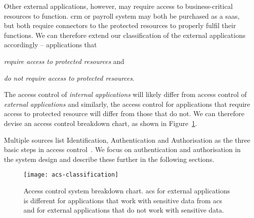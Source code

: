 Other external applications, however, may require access to business-critical resources to function. \acrlong{crm} or payroll system may both be purchased as a \acrshort{saas}, but both require connectors to the protected resources to properly fulfil their functions. We can therefore extend our classification of the external applications accordingly -- applications that
\begin{enumerate*}[label=(\roman*)]
    \item \textit{require access to protected resources} and
    \item \textit{do not require access to protected resources}.
\end{enumerate*}

The access control of \textit{internal applications} will likely differ from access control of \textit{external applications} and similarly, the access control for applications that require access to protected resource will differ from those that do not. We can therefore devise an access control breakdown chart, as shown in Figure~\ref{fig:acs-classification}. 

Multiple sources list Identification, Authentication and Authorisation as the three basic steps in access control~\cite{Harris2008CISSPGuide, 2018AccessSystems, 2003IdentificationAuthorization}. We focus on authentication and authorisation in the system design and describe these further in the following sections.

\begin{figure}[ht]
    \centering
    \texttt{[image: acs-classification]}
    \caption{Access control system breakdown chart. \acrshort{acs} for external applications is different for applications that work with sensitive data from \acrshort{acs} and for external applications that do not work with sensitive data.}
    \label{fig:acs-classification}
\end{figure}








\restoregeometry

